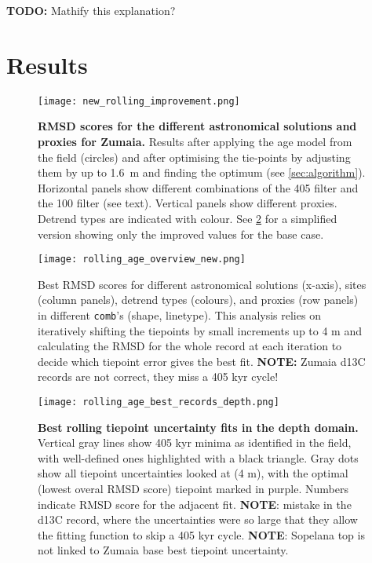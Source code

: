 \documentclass[draft]{agujournal2019}
\begin{document}
\textbf{TODO:} Mathify this explanation?




\section{Results}\label{sec:results}

\begin{figure}[htb]
  \centering \texttt{[image: new\_rolling\_improvement.png]}
  \caption{\label{fig:rolling-improvement} \textbf{RMSD scores for the
      different astronomical solutions and proxies for Zumaia.} Results after
    applying the age model from the field \cite{Batenburg2012;Batenburg2014}
    (circles) and after optimising the tie-points by adjusting them by
    up to \qty{1.6}{\metre} and finding the optimum (see \cref{sec:algorithm}).
    Horizontal panels show different combinations of the \qty{405}{\kiloyear}
    filter and the \qty{100}{\kiloyear} filter (see text). Vertical panels show
    different proxies. Detrend types are indicated with colour. See
    \cref{fig:rolling-rmsd} for a simplified version showing only the improved
    values for the base case.}
\end{figure}

\begin{figure}[htb]
  \centering
  \texttt{[image: rolling\_age\_overview\_new.png]}
  \caption{\label{fig:rolling-rmsd} Best \gls{RMSD} scores for different
    astronomical solutions (x-axis), sites (column panels), detrend types
    (colours), and proxies (row panels) in different \texttt{comb}'s (shape,
    linetype). This analysis relies on iteratively shifting the tiepoints by
    small increments up to \textpm{}4 m and calculating the \gls{RMSD} for the whole
    record at each iteration to decide which tiepoint error gives the best fit.
    \textbf{NOTE:} Zumaia \gls{d13C} records are not correct, they miss a 405
    kyr cycle! }
\end{figure}


\begin{figure}[htb]
  \centering
  \texttt{[image: rolling\_age\_best\_records\_depth.png]}
  \caption{\label{fig:rolling-depth} \textbf{Best rolling tiepoint uncertainty
      fits in the depth domain.} Vertical gray lines show 405 kyr minima as
    identified in the field, with well-defined ones highlighted with a black
    triangle. Gray dots show all tiepoint uncertainties looked at (\textpm{}4 m),
    with the optimal (lowest overal \gls{RMSD} score) tiepoint marked in
    purple. Numbers indicate \gls{RMSD} score for the adjacent fit.
    \textbf{NOTE}: mistake in the \gls{d13C} record, where the uncertainties
    were so large that they allow the fitting function to skip a 405 kyr cycle.
    \textbf{NOTE}: Sopelana top is not linked to Zumaia base best tiepoint
    uncertainty. }
\end{figure}
\end{document}
